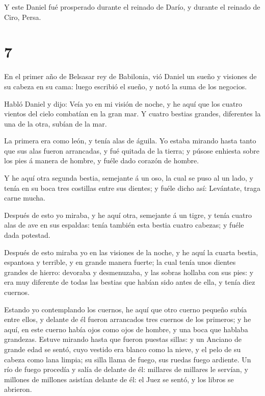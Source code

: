  Y este Daniel fué prosperado durante el reinado de Darío,
y durante el reinado de Ciro, Persa.

\hypertarget{section-6}{%
\section{7}\label{section-6}}

 En el primer año de Belsasar rey de Babilonia, vió Daniel
un sueño y visiones de su cabeza en su cama: luego escribió el sueño, y
notó la suma de los negocios.

 Habló Daniel y dijo: Veía yo en mi visión de noche, y he
aquí que los cuatro vientos del cielo combatían en la gran mar.
 Y cuatro bestias grandes, diferentes la una de la otra,
subían de la mar.

 La primera era como león, y tenía alas de águila. Yo estaba
mirando hasta tanto que sus alas fueron arrancadas, y fué quitada de la
tierra; y púsose enhiesta sobre los pies á manera de hombre, y fuéle
dado corazón de hombre.

 Y he aquí otra segunda bestia, semejante á un oso, la cual
se puso al un lado, y tenía en su boca tres costillas entre sus dientes;
y fuéle dicho así: Levántate, traga carne mucha.

 Después de esto yo miraba, y he aquí otra, semejante á un
tigre, y tenía cuatro alas de ave en sus espaldas: tenía también esta
bestia cuatro cabezas; y fuéle dada potestad.

 Después de esto miraba yo en las visiones de la noche, y he
aquí la cuarta bestia, espantosa y terrible, y en grande manera fuerte;
la cual tenía unos dientes grandes de hierro: devoraba y desmenuzaba, y
las sobras hollaba con sus pies: y era muy diferente de todas las
bestias que habían sido antes de ella, y tenía diez cuernos.

 Estando yo contemplando los cuernos, he aquí que otro
cuerno pequeño subía entre ellos, y delante de él fueron arrancados tres
cuernos de los primeros; y he aquí, en este cuerno había ojos como ojos
de hombre, y una boca que hablaba grandezas.  Estuve mirando
hasta que fueron puestas sillas: y un Anciano de grande edad se sentó,
cuyo vestido era blanco como la nieve, y el pelo de su cabeza como lana
limpia; su silla llama de fuego, sus ruedas fuego ardiente.
 Un río de fuego procedía y salía de delante de él:
millares de millares le servían, y millones de millones asistían delante
de él: el Juez se sentó, y los libros se abrieron.

